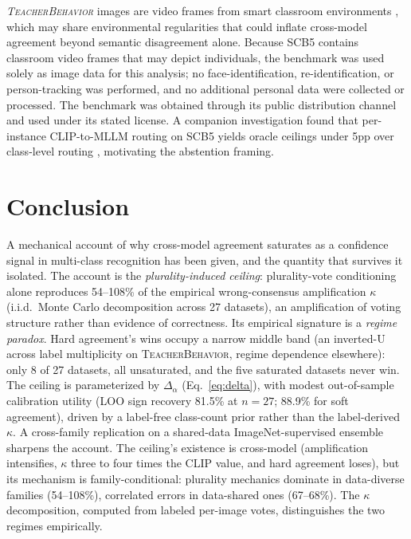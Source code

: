 \documentclass[a4paper,fleqn]{cas-sc}
\newcommand{\tb}{\textsc{TeacherBehavior}}
\newcommand{\scbfive}{\textsc{SCB5}}
\begin{document}
\emph{\tb} images are video frames from smart classroom environments \citep{scb5}, which may share environmental regularities that could inflate cross-model agreement beyond semantic disagreement alone.
Because \scbfive{} contains classroom video frames that may depict individuals, the benchmark was used solely as image data for this analysis; no face-identification, re-identification, or person-tracking was performed, and no additional personal data were collected or processed.
The benchmark was obtained through its public distribution channel and used under its stated license.
A companion investigation found that per-instance CLIP-to-MLLM routing on \scbfive{} yields oracle ceilings under 5pp over class-level routing \citep{phase0_oracle}, motivating the abstention framing.

\section{Conclusion}

A mechanical account of why cross-model agreement saturates as a confidence signal in multi-class recognition has been given, and the quantity that survives it isolated.
The account is the \emph{plurality-induced ceiling}: plurality-vote conditioning alone reproduces 54--108\% of the empirical wrong-consensus amplification $\kappa$ (i.i.d.\ Monte Carlo decomposition across 27 datasets), an amplification of voting structure rather than evidence of correctness.
Its empirical signature is a \emph{regime paradox}. Hard agreement's wins occupy a narrow middle band (an inverted-U across label multiplicity on \tb, regime dependence elsewhere): only 8 of 27 datasets, all unsaturated, and the five saturated datasets never win.
The ceiling is parameterized by $\Delta_\alpha$ (Eq.~\eqref{eq:delta}), with modest out-of-sample calibration utility (LOO sign recovery 81.5\% at $n{=}27$; 88.9\% for soft agreement), driven by a label-free class-count prior rather than the label-derived $\kappa$.
A cross-family replication on a shared-data ImageNet-supervised ensemble sharpens the account. The ceiling's existence is cross-model (amplification intensifies, $\kappa$ three to four times the CLIP value, and hard agreement loses), but its mechanism is family-conditional: plurality mechanics dominate in data-diverse families (54--108\%), correlated errors in data-shared ones (67--68\%).
The $\kappa$ decomposition, computed from labeled per-image votes, distinguishes the two regimes empirically.
\end{document}
